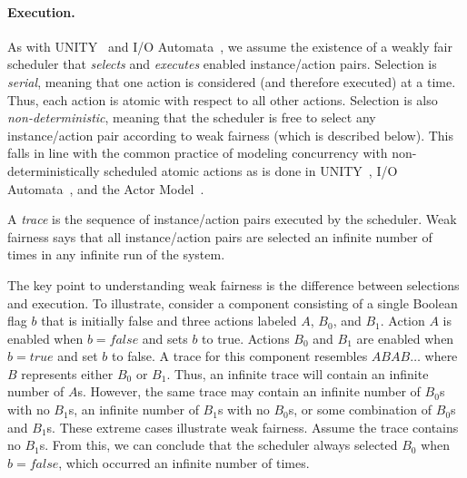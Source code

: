 \paragraph{Execution.}
As with UNITY~\cite{chandy1989parallel} and I/O Automata~\cite{nancy1996distributed}, we assume the existence of a weakly fair scheduler that \emph{selects} and \emph{executes} enabled instance/action pairs.
Selection is \emph{serial}, meaning that one action is considered (and therefore executed) at a time.
Thus, each action is atomic with respect to all other actions.
Selection is also \emph{non-deterministic}, meaning that the scheduler is free to select any instance/action pair according to weak fairness (which is described below).
This falls in line with the common practice of modeling concurrency with non-deterministically scheduled atomic actions as is done in UNITY~\cite{chandy1989parallel}, I/O Automata~\cite{nancy1996distributed}, and the Actor Model~\cite{agha1985actors}.

A \emph{trace} is the sequence of instance/action pairs executed by the scheduler.
Weak fairness says that all instance/action pairs are selected an infinite number of times in any infinite run of the system.

The key point to understanding weak fairness is the difference between selections and execution.
To illustrate, consider a component consisting of a single Boolean flag $b$ that is initially false and three actions labeled $A$, $B_0$, and $B_1$.
Action $A$ is enabled when $b = false$ and sets $b$ to true.
Actions $B_0$ and $B_1$ are enabled when $b = true$ and set $b$ to false.
A trace for this component resembles $ABAB \ldots$ where $B$ represents either $B_0$ or $B_1$.
Thus, an infinite trace will contain an infinite number of $A$s.
However, the same trace may contain an infinite number of $B_0$s with no $B_1$s, an infinite number of $B_1$s with no $B_0$s, or some combination of $B_0$s and $B_1$s.
These extreme cases illustrate weak fairness.
Assume the trace contains no $B_1$s.
From this, we can conclude that the scheduler always selected $B_0$ when $b = false$, which occurred an infinite number of times.


